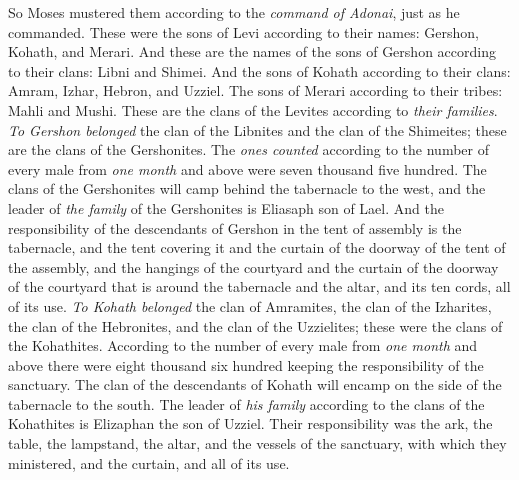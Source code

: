 \begin{biblechapter}
\verse So Moses mustered them according to the \textit{command of Adonai}, just as he commanded.
\verse These were the sons of Levi according to their names: Gershon, Kohath, and Merari.
\verse And these are the names of the sons of Gershon according to their clans: Libni and Shimei.
\verse And the sons of Kohath according to their clans: Amram, Izhar, Hebron, and Uzziel.
\verse The sons of Merari according to their tribes: Mahli and Mushi. These are the clans of the Levites according to \textit{their families}.
\verse \textit{To Gershon belonged} the clan of the Libnites and the clan of the Shimeites; these are the clans of the Gershonites.
\verse The \textit{ones counted} according to the number of every male from \textit{one month} and above were seven thousand five hundred.
\verse The clans of the Gershonites will camp behind the tabernacle to the west,
\verse and the leader of \textit{the family} of the Gershonites is Eliasaph son of Lael.
\verse And the responsibility of the descendants of Gershon in the tent of assembly is the tabernacle, and the tent covering it and the curtain of the doorway of the tent of the assembly,
\verse and the hangings of the courtyard and the curtain of the doorway of the courtyard that is around the tabernacle and the altar, and its ten cords, all of its use.
\verse \textit{To Kohath belonged} the clan of Amramites, the clan of the Izharites, the clan of the Hebronites, and the clan of the Uzzielites; these were the clans of the Kohathites.
\verse According to the number of every male from \textit{one month} and above there were eight thousand six hundred keeping the responsibility of the sanctuary.
\verse The clan of the descendants of Kohath will encamp on the side of the tabernacle to the south.
\verse The leader of \textit{his family} according to the clans of the Kohathites is Elizaphan the son of Uzziel.
\verse Their responsibility was the ark, the table, the lampstand, the altar, and the vessels of the sanctuary, with which they ministered, and the curtain, and all of its use.

\end{biblechapter}
